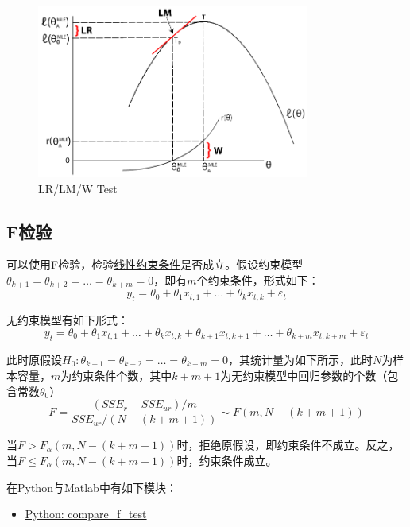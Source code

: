 \documentclass[11pt]{article}
\begin{document}
\begin{figure}[H]
    \centering
    \includegraphics[width=0.8\textwidth]{fig/lr-Lm-w-test.png}
    \caption{LR/LM/W Test}
\end{figure}

\subsection{F检验}

可以使用F检验，检验\uline{线性约束条件}是否成立。假设约束模型$\theta_{k+1}=\theta_{k+2}=\dots=\theta_{k+m}=0$，即有$m$个约束条件，形式如下：
\begin{equation*}
    y_t = \theta_0 + \theta_1 x_{t,1} + \dots + \theta_{k} x_{t,k} + \varepsilon_t
\end{equation*}

无约束模型有如下形式：
\begin{equation*}
    y_t = \theta_0 + \theta_1 x_{t,1} + \dots + \theta_{k} x_{t,k} + \theta_{k+1} x_{t,k+1} + \dots + \theta_{k+m} x_{t,k+m} + \varepsilon_t
\end{equation*}

此时原假设$H_0: \theta_{k+1}=\theta_{k+2}=\dots=\theta_{k+m}=0$，其统计量为如下所示，此时$N$为样本容量，$m$为约束条件个数，其中$k+m+1$为无约束模型中回归参数的个数（包含常数$\theta_0$）
\begin{equation*}
    F = \frac{(SSE_{r} - SSE_{ur})/m}{SSE_{ur}/(N-(k+m+1))} \sim F(m,N-(k+m+1))
\end{equation*}

当$F > F_{\alpha}(m,N-(k+m+1))$时，拒绝原假设，即约束条件不成立。反之，当$F \leq F_{\alpha}(m,N-(k+m+1))$时，约束条件成立。

\begin{remark}
    在Python与Matlab中有如下模块：
    \begin{itemize}
        \item \href{https://www.statsmodels.org/stable/generated/statsmodels.regression.linear_model.RegressionResults.compare_f_test.html}{Python: compare\_f\_test}
    \end{itemize}
\end{remark}
\end{document}
